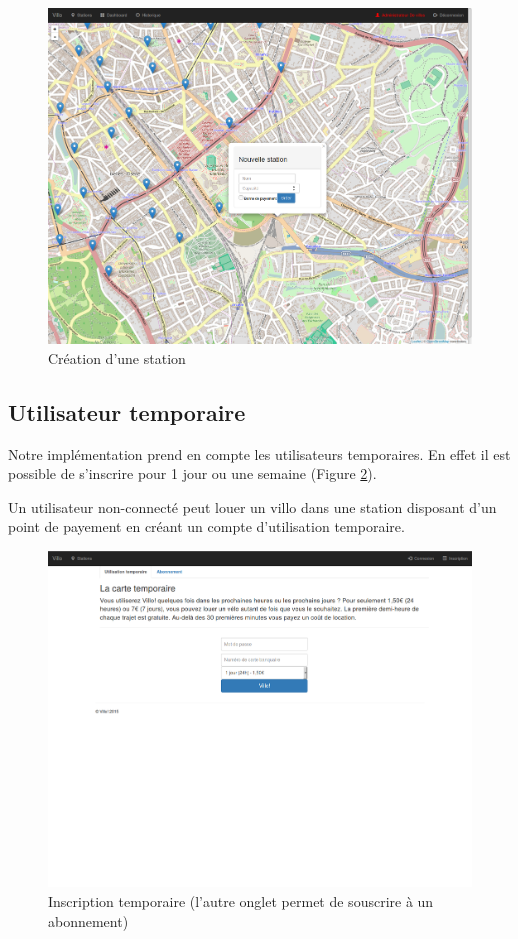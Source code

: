 \documentclass[a4paper,10pt]{article}
\begin{document}
\begin{figure}[H]
  \centering
  \includegraphics[scale=0.2]{create-station.png}
  \caption{\label{fig:create-station} Création d'une station}
\end{figure}

\subsection{Utilisateur temporaire}
Notre implémentation prend en compte les utilisateurs temporaires.
En effet il est possible de s'inscrire pour 1 jour ou une semaine (Figure \ref{fig:inscr}).

Un utilisateur non-connecté peut louer un villo dans une station disposant d'un point
de payement en créant un compte d'utilisation temporaire.

\begin{figure}[H]
  \centering
  \includegraphics[scale=0.2]{inscription.png}
  \caption{\label{fig:inscr} Inscription temporaire (l'autre onglet permet de souscrire à un abonnement)}
\end{figure}
\end{document}
